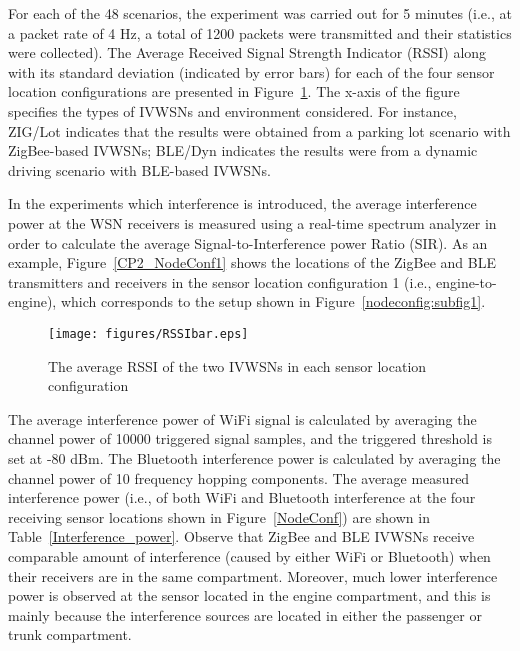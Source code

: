 \documentclass[journal]{IEEEtran}
\begin{document}
For each of the 48 scenarios, the experiment was carried out for 5 minutes (i.e., at a packet rate of 4 Hz, a total of 1200 packets were transmitted and their statistics were collected). The Average Received Signal Strength Indicator (RSSI) along with its standard deviation (indicated by error bars) for each of the four sensor location configurations are presented in Figure~\ref{RSSIbar}. The x-axis of the figure specifies the types of IVWSNs and environment considered. For instance, ZIG/Lot indicates that the results were obtained from a parking lot scenario with ZigBee-based IVWSNs; BLE/Dyn indicates the results were from a dynamic driving scenario with BLE-based IVWSNs.

In the experiments which interference is introduced, the average interference power at the WSN receivers is measured using a real-time spectrum analyzer in order to calculate the average Signal-to-Interference power Ratio (SIR). As an example, Figure~\ref{CP2_NodeConf1} shows the locations of the ZigBee and BLE transmitters and receivers in the sensor location configuration 1 (i.e., engine-to-engine), which corresponds to the setup shown in Figure~\ref{nodeconfig:subfig1}. 

\begin{figure}[tbp]
\centering
\texttt{[image: figures/RSSIbar.eps]}
\caption{The average RSSI of the two IVWSNs in each sensor location configuration}
\label{RSSIbar}
\end{figure}




 


























The average interference power of WiFi signal is calculated by averaging the channel power of 10000 triggered signal samples, and the triggered threshold is set at -80 dBm. The Bluetooth interference power is calculated by averaging the channel power of 10 frequency hopping components. 
The average measured interference power  (i.e., of both WiFi and Bluetooth interference at the four receiving sensor locations shown in Figure~\ref{NodeConf}) are shown in Table~\ref{Interference_power}. Observe that ZigBee and BLE IVWSNs receive comparable amount of interference (caused by either WiFi or Bluetooth) when their receivers are in the same compartment. Moreover, much lower interference power is observed at the sensor located in the engine compartment, and this is mainly because the interference sources are located in either the passenger or trunk compartment.
\end{document}
